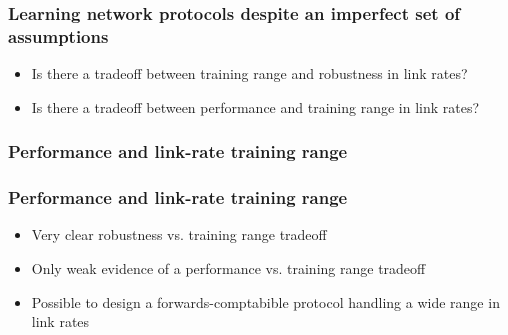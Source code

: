 \begin{frame}
\frametitle{Learning network protocols despite an imperfect set of assumptions}
\begin{itemize}
\item<2-> Is there a tradeoff between training range and robustness in link rates?
\item<3-> Is there a tradeoff between performance and training range in link rates?
\end{itemize}
\end{frame}


\begin{frame}
\frametitle{Performance and link-rate training range}
\begin{centering}

\noindent {}

\end{centering}
\end{frame}

\begin{frame}
\frametitle{Performance and link-rate training range}
\begin{itemize}
\item <2->{Very clear robustness vs. training range tradeoff}
\item <3->{Only weak evidence of a performance vs. training range tradeoff}
\item <4->{Possible to design a forwards-comptabible protocol handling a wide range in link rates}
\end{itemize}
\end{frame}
